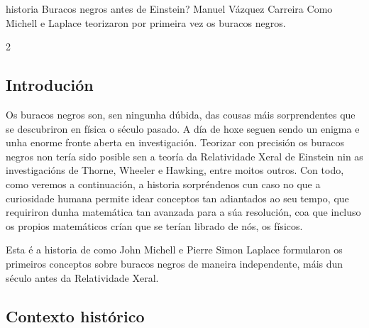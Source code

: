\Artigo%
{historia}%
{Buracos negros antes de Einstein?}%
{Manuel Vázquez Carreira}%
{Como Michell e Laplace teorizaron por primeira vez os buracos negros.}%


\begin{multicols}{2}

%
%

\subsection*{Introdución}

Os buracos negros son, sen ningunha dúbida, das cousas máis sorprendentes que
se descubriron en física o século pasado. A día de hoxe seguen sendo un enigma
e unha enorme fronte aberta en investigación. Teorizar con precisión os buracos
negros non tería sido posible sen a teoría da Relatividade Xeral de Einstein
nin as investigacións de Thorne, Wheeler e Hawking, entre moitos outros. Con
todo, como veremos a continuación, a historia sorpréndenos cun caso no que a
curiosidade humana permite idear conceptos tan adiantados ao seu tempo, que
requiriron dunha matemática tan avanzada para a súa resolución, coa que incluso os
propios matemáticos crían que se terían librado de nós, os físicos.

Esta é a historia de como John Michell e Pierre Simon Laplace formularon os
primeiros conceptos sobre buracos negros de maneira independente, máis dun
século antes da Relatividade Xeral.

\subsection*{Contexto histórico}


\end{multicols}
